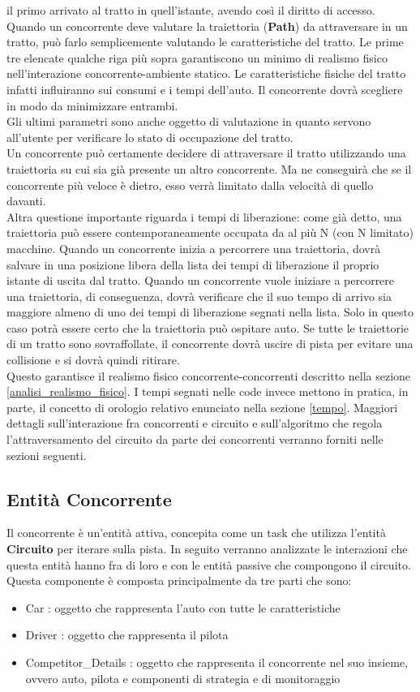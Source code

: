 il primo arrivato al tratto in quell'istante, avendo così
il diritto di accesso.\\
Quando un concorrente deve valutare la traiettoria (\textbf{Path}) da
attraversare in un tratto, può farlo semplicemente valutando le caratteristiche
del tratto. Le prime tre elencate qualche riga più sopra garantiscono un minimo
di realismo fisico nell'interazione concorrente-ambiente statico. Le caratteristiche fisiche del tratto infatti
influiranno sui consumi e i tempi dell'auto. Il concorrente dovrà scegliere in
modo da minimizzare entrambi.\\
Gli ultimi parametri sono anche oggetto di valutazione in quanto servono all'utente per
verificare lo stato di occupazione del tratto.\\
Un concorrente può certamente decidere di attraversare il tratto utilizzando una traiettoria
su cui sia già presente un altro concorrente. Ma ne conseguirà che se il concorrente
più veloce è dietro, esso verrà limitato dalla velocità di quello davanti.\\
Altra questione importante riguarda i tempi di liberazione: come già detto, una
traiettoria può essere contemporaneamente occupata da al più N (con N limitato) macchine.
Quando un concorrente inizia a percorrere una traiettoria, dovrà salvare in una posizione
libera della lista dei tempi di liberazione il proprio istante di uscita dal tratto.
Quando un concorrente vuole iniziare a percorrere una traiettoria, di conseguenza, dovrà verificare
che il suo tempo di arrivo sia maggiore almeno di uno dei tempi di liberazione segnati
nella lista. Solo in questo caso potrà essere certo che la traiettoria può ospitare auto.
Se tutte le traiettorie di un tratto sono sovraffollate, il concorrente dovrà
uscire di pista per evitare una collisione e si dovrà quindi ritirare.\\
Questo garantisce il realismo fisico
concorrente-concorrenti descritto nella sezione \ref{analisi_realismo_fisico}.
I tempi segnati nelle code invece mettono in pratica, in parte, il concetto di
orologio relativo enunciato nella sezione \ref{tempo}.
Maggiori dettagli sull'interazione fra concorrenti e circuito e sull'algoritmo
che regola l'attraversamento del circuito da parte dei concorrenti
verranno forniti nelle sezioni seguenti.
\subsection{Entit\`{a} Concorrente}
Il concorrente è un'entità attiva, concepita
come un task che utilizza l'entità \textbf{Circuito} per iterare sulla pista. In
seguito
verranno analizzate le interazioni che questa entità hanno fra di loro e con le
entità passive che compongono il circuito.
Questa componente è composta principalmente da tre parti che sono:
\begin{itemize}
\item Car : oggetto che rappresenta l'auto con tutte le caratteristiche
\item Driver : oggetto che rappresenta il pilota
\item Competitor\_Details : oggetto che rappresenta il concorrente nel suo
insieme, ovvero auto, pilota e componenti di strategia e di monitoraggio
\end{itemize}
